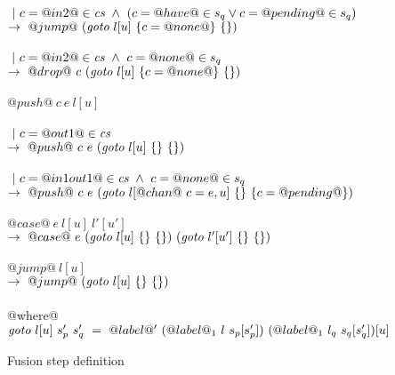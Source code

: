 \begin{figure}
\begin{tabbing}
\> \> \\
\> \> $~|~c=@in2@\in\textit{cs} ~\wedge~ (c=@have@ \in s_q \vee c=@pending@ \in s_q)$ \\
\> \> $\to~@jump@~(\textit{goto}~l[u]~\{ c=@none@ \}~\{  \}) $ \\

\> \> \\
\> \> $~|~c=@in2@\in\textit{cs} ~\wedge~ c=@none@ \in s_q$ \\
\> \> $\to~@drop@~c~(\textit{goto}~l[u]~\{ c=@none@ \}~\{  \}) $ \\
\\

\> $@push@~c~e~l[u]$ \\
\> \> \\
\> \> $~|~c=@out1@\in\textit{cs}$ \\
\> \> $\to~@push@~c~e~(\textit{goto}~l[u]~\{  \}~\{  \}) $ \\

\> \> \\
\> \> $~|~c=@in1out1@\in\textit{cs} ~\wedge~ c=@none@ \in s_q$ \\
\> \> $\to~@push@~c~e~(\textit{goto}~l[@chan@~c=e,u]~\{  \}~\{ c=@pending@ \}) $ \\
\\

\> $@case@~e~l[u]~l'[u']$ \\
\> \> $\to~@case@~e~(\textit{goto}~l[u]~\{  \}~\{  \})~(\textit{goto}~l'[u']~\{  \}~\{  \}) $ \\
\\

\> $@jump@~l[u]$ \\
\> \> $\to~@jump@~(\textit{goto}~l[u]~\{  \}~\{  \}) $ \\
\\


@where@ \\
\> $\textit{goto}~l[u]~s_p'~s_q' ~=~ @label@'~(@label@_1~l~s_p[s_p'])~(@label@_1~l_q~s_q[s_q'])[u]$ \\
\end{tabbing}

\caption{Fusion step definition}
\label{fig:Fusion:Def:Step}
\end{figure}

